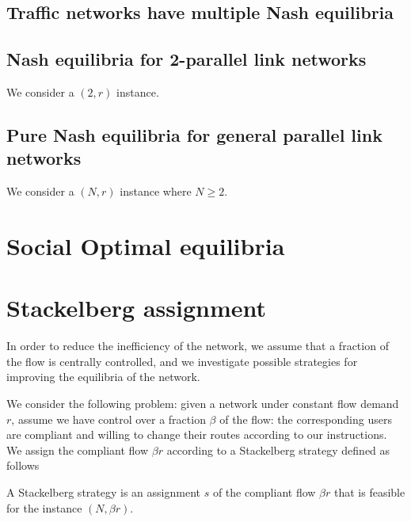 \subsection{Traffic networks have multiple Nash equilibria}


\subsection{Nash equilibria for 2-parallel link networks}
We consider a $(2, r)$ instance.


\subsection{Pure Nash equilibria for general parallel link networks}
We consider a $(N, r)$ instance where $N \geq 2$.


\section{Social Optimal equilibria}


\section{Stackelberg assignment}
In order to reduce the inefficiency of the network, we assume that a fraction of the flow is centrally controlled, and we investigate possible strategies for improving the equilibria of the network. 

We consider the following problem: given a network under constant flow demand $r$, assume we have control over a fraction $\beta$ of the flow: the corresponding users are compliant and willing to change their routes according to our instructions. We assign the compliant flow $\beta r$ according to a Stackelberg strategy defined as follows

\begin{definition}
A Stackelberg strategy is an assignment $s$ of the compliant flow $\beta r$ that is feasible for the instance $(N, \beta r)$.
\end{definition}

